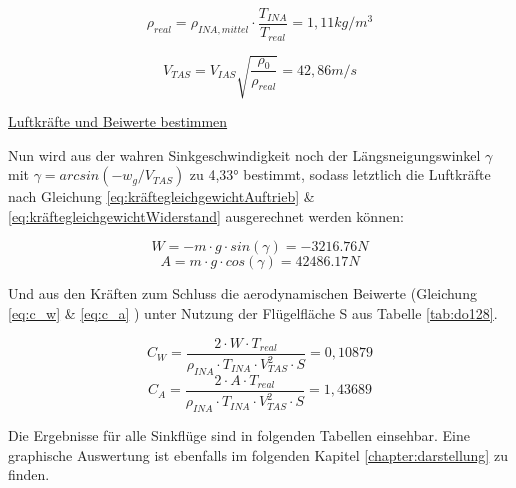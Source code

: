 \vspace{5mm}

\begin{equation*}
\rho_{real} = \rho_{INA,mittel} \cdot \frac{T_{INA}}{T_{real}} = 1,11 kg/m^3
\end{equation*}

\vspace{5mm}

\begin{equation*}
V_{TAS} = V_{IAS}\sqrt{\frac{\rho_0}{\rho_{real}}} =42,86 m/s
\end{equation*}


\vspace{5mm} \noindent
\underline{Luftkräfte und Beiwerte bestimmen}

\noindent Nun wird aus der wahren Sinkgeschwindigkeit noch der Längsneigungswinkel $\gamma$ mit $\gamma = arcsin(-w_g/V_{TAS})$ zu 4,33° bestimmt, sodass letztlich die Luftkräfte nach Gleichung \ref{eq:kräftegleichgewichtAuftrieb} \& \ref{eq:kräftegleichgewichtWiderstand} ausgerechnet werden können:

\begin{equation*}
W = - m\cdot g \cdot sin(\gamma) = -3216.76 N
\end{equation*}
\begin{equation*}
A = m\cdot g \cdot cos(\gamma) = 42486.17 N
\end{equation*}

\vspace{5mm} \noindent
Und aus den Kräften zum Schluss die aerodynamischen Beiwerte (Gleichung \ref{eq:c_w} \& \ref{eq:c_a} ) unter Nutzung der Flügelfläche S aus Tabelle \ref{tab:do128}.

\begin{equation*}
C_W = \frac{2 \cdot W \cdot T_{real}}{\rho_{INA} \cdot T_{INA} \cdot V_{TAS}^2 \cdot S} = 0,10879
\end{equation*}
\begin{equation*}
C_A = \frac{2 \cdot A \cdot T_{real}}{\rho_{INA} \cdot T_{INA} \cdot V_{TAS}^2 \cdot S} = 1,43689
\end{equation*}

\vspace{5mm} \noindent
Die Ergebnisse für alle Sinkflüge sind in folgenden Tabellen einsehbar. Eine graphische Auswertung ist ebenfalls im folgenden Kapitel \ref{chapter:darstellung} zu finden.\\

